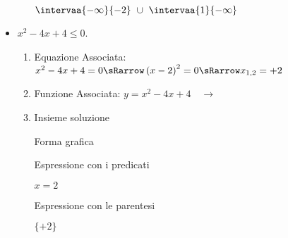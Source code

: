 \begin{esempio}
\begin{itemize}
\begin{enumerate}
\begin{minipage}{.32\textwidth}
 \begin{center}
  \(\intervaa{-\infty}{-2}~\cup~\intervaa{1}{-\infty}\)
  \vspace{.8em}
 \end{center}
  \end{minipage}
\end{enumerate}

\item $x^2-4x+4\le0$.

\begin{enumerate}
 \item
  Equazione Associata:~\(x^2-4x+4=0 \sRarrow 
                        \left(x-2 \right)^2=0 \sRarrow 
                        x_{1,2}=+2\)
 \item 
  \begin{minipage}{.45\textwidth}
  Funzione Associata: \(y = x^2-4x+4 \quad \rightarrow\)
  \end{minipage}
  \begin{minipage}{.30\textwidth}
  \end{minipage}
 \item 
 Insieme soluzione\\
 
  \begin{minipage}{.32\textwidth}
  Forma grafica\\[-.7em]
  
 \begin{center}
  \vspace{.4em}
 \end{center}
  \end{minipage}
  \begin{minipage}{.32\textwidth}
  Espressione con i predicati\\[-.3em]
  
 \begin{center}
  \(x=2\)
  \vspace{1em}
 \end{center}
  \end{minipage}
  \begin{minipage}{.32\textwidth}
  Espressione con le parentesi\\[-.3em]
  
 \begin{center}
  \(\lbrace +2 \rbrace\)
  \vspace{.8em}
 \end{center}
  \end{minipage}
\end{enumerate}


\end{itemize}
\end{esempio}

